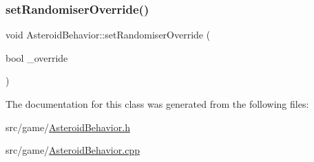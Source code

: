 \mbox{\label{class_asteroid_behavior_a6059686f8a09c3911187407143d3a3cf}} 
\subsubsection{\texorpdfstring{set\+Randomiser\+Override()}{setRandomiserOverride()}}
{\footnotesize\ttfamily void Asteroid\+Behavior\+::set\+Randomiser\+Override (\begin{DoxyParamCaption}\item[{bool}]{\+\_\+override }\end{DoxyParamCaption})}



The documentation for this class was generated from the following files\+:\begin{DoxyCompactItemize}
\item 
src/game/\hyperlink{_asteroid_behavior_8h}{Asteroid\+Behavior.\+h}\item 
src/game/\hyperlink{_asteroid_behavior_8cpp}{Asteroid\+Behavior.\+cpp}\end{DoxyCompactItemize}
